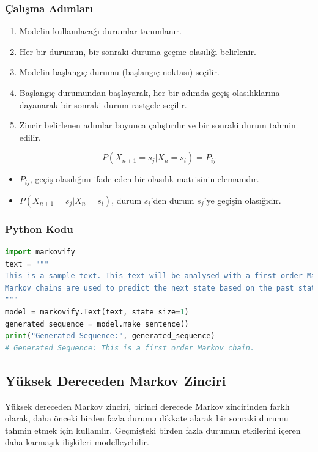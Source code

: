 \subsubsection{Çalışma Adımları}
\begin{enumerate}
    \item Modelin kullanılacağı durumlar tanımlanır.
    \item Her bir durumun, bir sonraki duruma geçme olasılığı belirlenir.
    \item Modelin başlangıç durumu (başlangıç noktası) seçilir.
    \item Başlangıç durumundan başlayarak, her bir adımda geçiş olasılıklarına dayanarak bir sonraki durum rastgele seçilir.
    \item Zincir belirlenen adımlar boyunca çalıştırılır ve bir sonraki durum tahmin edilir.
\end{enumerate}

\[P(X_{n+1} = s_j | X_n = s_i) = P_{ij}\]

\begin{itemize}
    \item $P_{ij}$, geçiş olasılığını ifade eden bir olasılık matrisinin elemanıdır.
    \item $P(X_{n+1} = s_j | X_n = s_i)$, durum  $s_{i}$'den durum $s_{j}$'ye geçişin olasığıdır.
\end{itemize}

\subsubsection{Python Kodu}

\begin{lstlisting}[language=Python]
import markovify
text = """
This is a sample text. This text will be analysed with a first order Markov chain. 
Markov chains are used to predict the next state based on the past state.
"""
model = markovify.Text(text, state_size=1)
generated_sequence = model.make_sentence()
print("Generated Sequence:", generated_sequence)
# Generated Sequence: This is a first order Markov chain.   
\end{lstlisting}

\newpage

\subsection{Yüksek Dereceden Markov Zinciri}
Yüksek dereceden Markov zinciri, birinci derecede Markov zincirinden farklı olarak, daha önceki birden fazla durumu dikkate alarak bir sonraki durumu tahmin etmek için kullanılır. Geçmişteki birden fazla durumun etkilerini içeren daha karmaşık ilişkileri modelleyebilir. 

